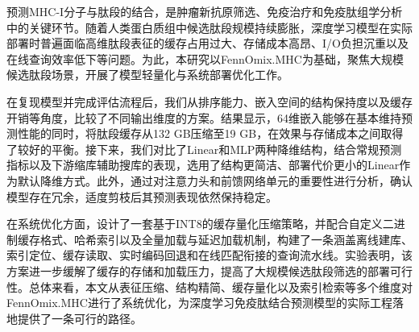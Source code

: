 预测MHC-I分子与肽段的结合，是肿瘤新抗原筛选、免疫治疗和免疫肽组学分析中的关键环节。随着人类蛋白质组中候选肽段规模持续膨胀，深度学习模型在实际部署时普遍面临高维肽段表征的缓存占用过大、存储成本高昂、I/O负担沉重以及在线查询效率低下等问题。为此，本研究以FennOmix.MHC为基础，聚焦大规模候选肽段场景，开展了模型轻量化与系统部署优化工作。

在复现模型并完成评估流程后，我们从排序能力、嵌入空间的结构保持度以及缓存开销等角度，比较了不同输出维度的方案。结果显示，64维嵌入能够在基本维持预测性能的同时，将肽段缓存从132 GB压缩至19 GB，在效果与存储成本之间取得了较好的平衡。接下来，我们对比了Linear和MLP两种降维结构，结合常规预测指标以及下游缩库辅助搜库的表现，选用了结构更简洁、部署代价更小的Linear作为默认降维方式。此外，通过对注意力头和前馈网络单元的重要性进行分析，确认模型存在冗余，适度剪枝后其预测表现依然保持稳定。

在系统优化方面，设计了一套基于INT8的缓存量化压缩策略，并配合自定义二进制缓存格式、哈希索引以及全量加载与延迟加载机制，构建了一条涵盖离线建库、索引定位、缓存读取、实时编码回退和在线匹配衔接的查询流水线。实验表明，该方案进一步缓解了缓存的存储和加载压力，提高了大规模候选肽段筛选的部署可行性。总体来看，本文从表征压缩、结构精简、缓存量化以及索引检索等多个维度对FennOmix.MHC进行了系统优化，为深度学习免疫肽结合预测模型的实际工程落地提供了一条可行的路径。